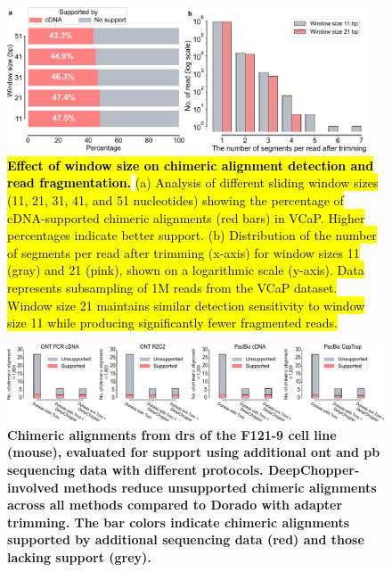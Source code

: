 \documentclass[pdflatex,sn-nature, lineno]{sn-jnl}%
\begin{document}
\begin{figure}
	\begin{center}
		\includegraphics[width=0.95\textwidth]{finals/slidewindow}
	\end{center}
	\caption{ {\bf \hl{Effect of window size on chimeric alignment detection and read fragmentation.}}
		\hl{(a) Analysis of different sliding window sizes (11, 21, 31, 41, and 51
			nucleotides) showing the percentage of cDNA-supported chimeric alignments (red bars) in VCaP.
			Higher percentages indicate better support.
			(b) Distribution of the number of segments per read after trimming (x-axis) for window sizes 11 (gray) and 21 (pink), shown on a logarithmic scale (y-axis). Data represents subsampling of 1M reads from the VCaP dataset. Window size 21
			maintains similar detection sensitivity to window size 11 while producing
			significantly fewer fragmented reads.}}
	\label{fig:slidewindow}
\end{figure}

\begin{figure}[!ht]
	\includegraphics[height=0.2\columnwidth]{finals/sf2}
	\caption{ {\bf Chimeric alignments from \gls{drs} of the F121-9 cell line (mouse), evaluated for support using additional \gls{ont} and \gls{pb} sequencing data with different protocols. DeepChopper-involved methods reduce unsupported chimeric alignments across all methods compared to Dorado with adapter trimming. The bar colors indicate chimeric alignments supported by additional sequencing data (red) and those lacking support (grey).}}\label{fig:sf2}
\end{figure}
\end{document}

